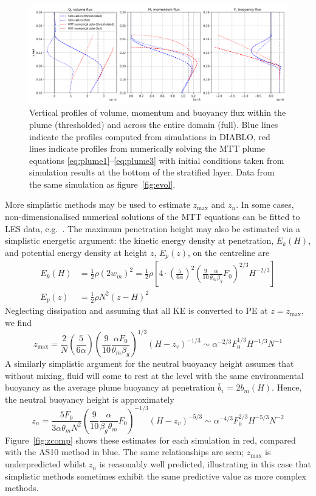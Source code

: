 \documentclass[a4paper]{article}
\begin{document}
\begin{figure}
	\centering
	\includegraphics[width=\textwidth]{fluxes}
	\caption{Vertical profiles of volume, momentum and buoyancy flux within the plume (thresholded) and across
		the entire domain (full). Blue lines indicate the profiles computed from simulations in DIABLO, red
		lines indicate profiles from numerically solving the MTT plume equations
		\eqref{eq:plume1}--\eqref{eq:plume3} with initial conditions taken from simulation results at the
		bottom of the stratified layer. Data from the same simulation as figure~\ref{fig:evol}.}
	\label{fig:fluxes}
\end{figure}

More simplistic methods may be used to estimate $z_{\max}$ and $z_n$. In some cases,
non-dimensionalised numerical solutions of the MTT equations can be fitted to LES data, e.g.\
\citet{devenish2010}. The maximum penetration height may also be estimated via a simplistic energetic
argument: the kinetic energy density at penetration, $E_k(H)$, and potential energy density at height $z$,
$E_p(z)$, on the centreline are
\begin{align}
	E_k(H) &= \frac{1}{2}\rho (2 w_m)^2 = \frac{1}{2}\rho \left[4 \cdot \left(\frac{5}{6\alpha}\right)^2
		\left(\frac{9}{10} \frac{\alpha}{\theta_m \beta_g} F_0\right)^{2/3} H^{-2/3}\right]\\
	E_p(z) &= \frac{1}{2}\rho N^2 (z-H)^2
\end{align}
Neglecting dissipation and assuming that all KE is converted to PE at $z=z_{\max}$, we find
\begin{equation}
	z_{\max} = \frac{2}{N} \left(\frac{5}{6\alpha}\right)\left(\frac{9}{10}\frac{\alpha F_0}{\theta_m \beta_g}
		\right)^{1/3} \left(H-z_v\right)^{-1/3} \sim \alpha^{-2/3} F_0^{1/3} H^{-1/3} N^{-1} 
\end{equation}
A similarly simplistic argument for the neutral buoyancy height assumes that without mixing, fluid will come to
rest at the level with the same environmental buoyancy as the average plume buoyancy at penetration
$\overline{b}_i$ = 2$b_m(H)$. Hence, the neutral buoyancy height is approximately
\begin{equation}
	z_n = \frac{5F_0}{3\alpha \theta_m N^2} \left(\frac{9}{10}\frac{\alpha}{\beta_g \theta_m}
	F_0\right)^{-1/3} \left(H-z_v\right)^{-5/3} \sim \alpha^{-4/3} F_0^{2/3} H^{-5/3} N^{-2}
\end{equation}
Figure~\ref{fig:zcomp} shows these estimates for each simulation in red, compared with the AS10 method in
blue. The same relationships are seen; $z_{\max}$ is underpredicted whilst $z_n$ is reasonably well predicted,
illustrating in this case that simplistic methods sometimes exhibit the same predictive value as more complex
methods.
\end{document}
